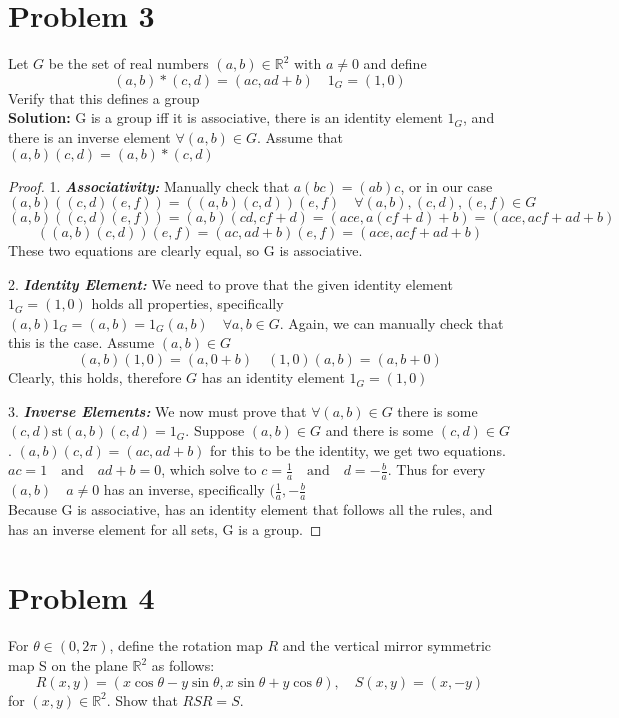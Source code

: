 \documentclass{article}
\begin{document}
\section{Problem 3}
Let $G$ be the set of real numbers $(a, b) \in \mathbb{R}^2 \textrm{ with }a\neq 0$ and define \\
$$(a,b)*(c,d)=(ac, ad+b) \quad 1_G=(1,0)$$
Verify that this defines a group \\
\noindent \textbf{Solution:} 
    G is a group iff it is associative, there is an identity element $1_G$, and there is an inverse element $\forall (a,b) \in G$. Assume that $(a,b)(c,d)=(a,b)*(c,d)$
\begin{proof}

1. \textbf{\textit{Associativity:}} Manually check that $a(bc)=(ab)c$, or in our case $(a,b)((c,d)(e,f))=((a,b)(c,d))(e,f) \quad \forall (a,b),(c,d),(e,f) \in G$ \\
$$(a,b)((c,d)(e,f))=(a,b)(cd, cf+d)=(ace, a(cf+d)+b)=(ace, acf+ad+b)$$
$$((a,b)(c,d))(e,f)=(ac,ad+b)(e,f)=(ace, acf+ad+b)$$
These two equations are clearly equal, so G is associative.

2. \textbf{\textit{Identity Element:}} We need to prove that the given identity element $1_G=(1,0)$ holds all properties, specifically $(a,b)1_G=(a,b)=1_G(a,b) \quad \forall a,b \in G$. Again, we can manually check that this is the case. Assume $(a,b) \in G$
$$(a,b)(1,0)=(a,0+b)\quad (1,0)(a,b)=(a, b+0)$$ 
Clearly, this holds, therefore $G$ has an identity element $1_G=(1,0)$

3. \textbf{\textit{Inverse Elements:}} We now must prove that $\forall (a,b) \in G$ there is some $(c, d) \textrm{st} (a,b)(c,d)=1_G$. Suppose $(a,b) \in G$ and there is some $(c,d) \in G$. $(a,b)(c,d)=(ac, ad+b)$ for this to be the identity, we get two equations. $ac=1 \quad \textrm{and} \quad ad+b=0$, which solve to $c=\frac{1}{a} \quad \textrm{and} \quad d=-\frac{b}{a}$. Thus for every $(a,b) \quad a\neq 0$ has an inverse, specifically $(\frac{1}{a},-\frac{b}{a}$ \\
Because G is associative, has an identity element that follows all the rules, and has an inverse element for all sets, G is a group.
\end{proof}

\section{Problem 4}
For $\theta \in (0, 2\pi)$, define the rotation map $R$ and the vertical mirror symmetric map S on the plane $\mathbb{R}^2$ as follows:
$$R(x, y) = (x \cos \theta - y \sin \theta, x \sin \theta + y \cos \theta), \quad S(x,y) = (x, -y)$$
for $(x, y) \in \mathbb{R}^2$. Show that $RSR=S$.
\end{document}
